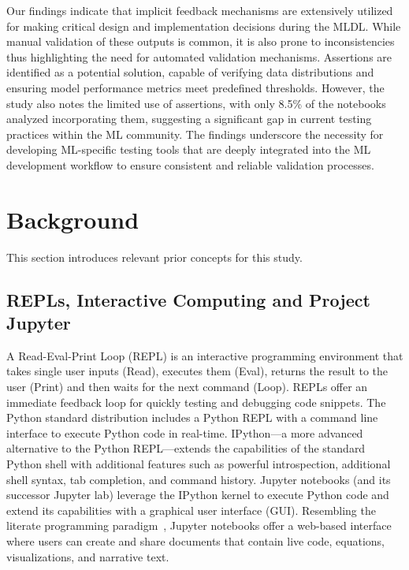 \documentclass[journal]{IEEEtran}       %
\begin{document}
Our findings indicate that implicit feedback mechanisms are
extensively utilized for making critical design and implementation
decisions during the MLDL. While manual validation of these outputs
is common, it is also prone to inconsistencies thus highlighting the
need for automated validation mechanisms. Assertions are identified
as a potential solution, capable of verifying data distributions and
ensuring model performance metrics meet predefined thresholds.
However, the study also notes the limited use of assertions, with
only 8.5\% of the notebooks analyzed incorporating them, suggesting a
significant gap in current testing practices within the ML community.
The findings underscore the necessity for developing ML-specific
testing tools that are deeply integrated into the ML development
workflow to ensure consistent and reliable validation processes.

\section{Background}\label{sec:background}

This section introduces relevant prior concepts for this study.

\subsection{REPLs, Interactive Computing and Project Jupyter}

A Read-Eval-Print Loop (REPL) is an interactive programming
environment that takes single user inputs (Read), executes them
(Eval), returns the result to the user (Print) and then waits for the
next command (Loop). REPLs offer an immediate feedback loop for
quickly testing and debugging code snippets. The Python standard
distribution includes a Python REPL with a command line interface to
execute Python code in real-time. IPython---a more advanced
alternative to the Python REPL---extends the capabilities of the
standard Python shell with additional features such as powerful
introspection, additional shell syntax, tab completion, and command
history. Jupyter notebooks (and its successor Jupyter lab) leverage
the IPython kernel to execute Python code and extend its capabilities
with a graphical user interface (GUI). Resembling the literate
programming paradigm~\cite{knuth1984literate}, Jupyter notebooks
offer a web-based interface where users can create and share
documents that contain live code, equations, visualizations, and narrative text.
\end{document}
